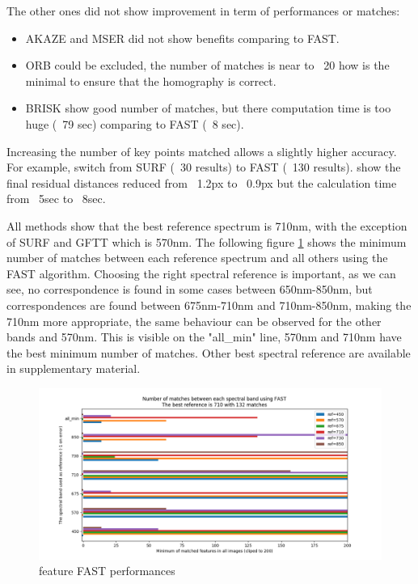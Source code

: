 \documentclass[]{elsarticle}
\begin{document}
	\noindent
	The other ones did not show improvement in term of performances or matches:
	\begin{itemize}
		\item AKAZE and MSER did not show benefits comparing to FAST.
		\item ORB could be excluded, the number of matches is near to ~20 how is the minimal to ensure that the homography is correct.
		\item BRISK show good number of matches, but there computation time is too huge (~79 sec) comparing to FAST (~8 sec).
	\end{itemize}
	
	Increasing the number of key points matched allows a slightly higher accuracy. For example, switch from SURF (~30 results) to FAST (~130 results). show the final residual distances reduced from ~1.2px to ~0.9px but the calculation time from ~5sec to ~8sec.

	All methods show that the best reference spectrum is 710nm, with the exception of SURF and GFTT which is 570nm.
	The following figure \ref{fig:features-FAST-performances} shows the minimum number of matches between each reference spectrum and all others using the FAST algorithm.
	Choosing the right spectral reference is important, as we can see, no correspondence is found in some cases between 650nm-850nm,
	but correspondences are found between 675nm-710nm and 710nm-850nm, making the 710nm more appropriate,
	the same behaviour can be observed for the other bands and 570nm.
	This is visible on the "all\_min" line, 570nm and 710nm have the best minimum number of matches.
	Other best spectral reference are available in supplementary material.
	
	\begin{figure}[!htb]
		\centering
		\includegraphics[width=\linewidth]{../figures/comparaison-keypoint-matching-reference-FAST.png}
		\caption{feature FAST performances}
		\label{fig:features-FAST-performances}
	\end{figure}
	
\end{document}
